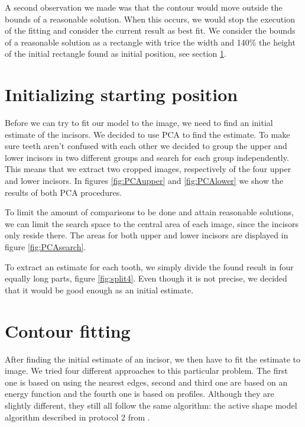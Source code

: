 \documentclass[a4paper,10pt]{article}
\begin{document}
A second observation we made was that the contour would move outside the bounds of a reasonable solution. When this occurs, we would stop the execution of the fitting and consider the current result as best fit. We consider the bounds of a reasonable solution as a rectangle with trice the width and 140\% the height of the initial rectangle found as initial position, see section \ref{sec:initial}.


\section{Initializing starting position}\label{sec:initial}
Before we can try to fit our model to the image, we need to find an initial estimate of the incisors. We decided to use PCA to find the estimate.
To make sure teeth aren't confused with each other we decided to group the upper and lower incisors in two different groups and search for each group independently. This means that we extract two cropped images, respectively of the four upper and lower incisors. In figures \ref{fig:PCAupper} and \ref{fig:PCAlower} we show the results of both PCA procedures.

To limit the amount of comparisons to be done and attain reasonable solutions, we can limit the search space to the central area of each image, since the incisors only reside there. The areas for both upper and lower incisors are displayed in figure \ref{fig:PCAsearch}.

To extract an estimate for each tooth, we simply divide the found result in four equally long parts, figure \ref{fig:split4}. Even though it is not precise, we decided that it would be good enough as an initial estimate.

\section{Contour fitting}\label{sec:fit}
After finding the initial estimate of an incisor, we then have to fit the estimate to image. We tried four different approaches to this particular problem. The first one is based on using the nearest edges, second and third one are based on an energy function and the fourth one is based on profiles. Although they are slightly different, they still all follow the same algorithm: the active shape model algorithm described in protocol 2 from \cite{TemplateAlgorithm}.
\end{document}
